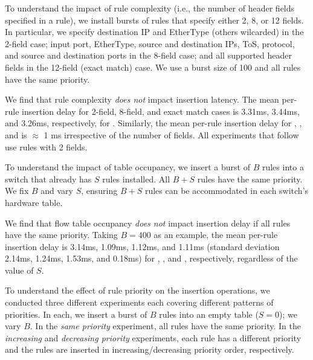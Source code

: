 
To understand the impact of rule complexity (i.e., the number of header 
fields specified in a rule), we install bursts of rules that specify either
2, 8, or 12 fields. In particular, we specify destination IP and EtherType
(others wilcarded) in the 2-field case; input port, EtherType, source and
destination IPs, ToS, protocol, and source and destination ports in the
8-field case; and all supported header fields in the 12-field (exact match)
case. We use a burst size of 100 and all rules have the same priority.

We find that rule complexity {\em does not} impact insertion latency. The
mean per-rule insertion delay for 2-field, 8-field, and exact
match cases is 3.31ms, 3.44ms, and 3.26ms, respectively, for \BroadcomOne.
Similarly, the mean per-rule insertion delay for \Intel, \IBM, and
\BroadcomThree is $\approx$ 1 ms irrespective of the number of fields. 
All experiments that follow use rules with 2 fields.

 To understand the impact of table occupancy, we
insert a burst of $B$ rules into a switch that already has $S$ rules
installed. All $B+S$ rules have the same priority. We fix $B$ and
vary $S$, ensuring $B+S$ rules can be accommodated in each switch's hardware
table.

We find that flow table occupancy {\em
does not} impact insertion delay if all rules have the same priority.
Taking $B=400$ as an example, the mean per-rule insertion delay is 3.14ms, 
1.09ms, 1.12ms, and 1.11ms (standard deviation 2.14ms, 1.24ms, 1.53ms, and
        0.18ms) for \BroadcomOne, \BroadcomThree, \IBM
and \Intel, respectively, regardless of the value of $S$. 

 To understand the effect of rule priority on the
insertion operations, we conducted three different experiments each covering
different patterns of priorities. In each, we insert a burst of $B$ rules
into an empty table ($S=0$); we vary $B$. In the {\em same priority}
experiment, all rules have the same priority. In the {\em increasing} and
{\em decreasing priority} experiments, each rule has a different priority and
the rules are inserted in increasing/decreasing priority order, respectively. 

